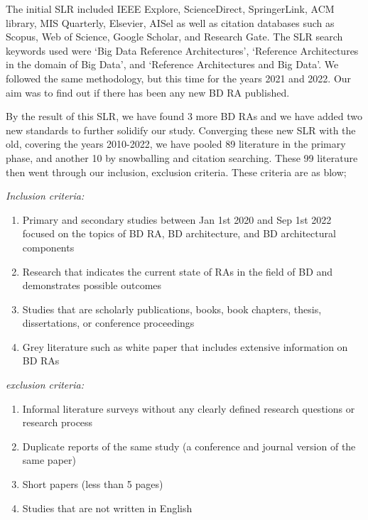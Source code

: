 \documentclass[review]{elsarticle}
\begin{document}
\begin{enumerate}
    The initial SLR included IEEE Explore, ScienceDirect, SpringerLink, ACM library, MIS Quarterly, Elsevier, AISel as well as citation databases such as Scopus, Web of Science, Google Scholar, and Research Gate. The SLR search keywords used were `Big Data Reference Architectures’, `Reference Architectures in the domain of Big Data’, and `Reference Architectures and Big Data’. We followed the same methodology, but this time for the years 2021 and 2022. Our aim was to find out if there has been any new BD RA published.

    By the result of this SLR, we have found 3 more BD RAs \cite{AtaeiApsec,castellanos2021smart,sang2017simplifying} and we have added two new standards \cite{ISO20546,ISO20547} to further solidify our study. Converging these new SLR with the old, covering the years 2010-2022, we have pooled 89 literature in the primary phase, and another 10 by snowballing and citation searching. These 99 literature then went through our inclusion, exclusion criteria. These criteria are as blow;

        \emph{Inclusion criteria:}
        \begin{enumerate}
            \item Primary and secondary studies between Jan 1st 2020 and Sep 1st 2022 focused on the topics of BD RA, BD architecture, and BD architectural components
            \item Research that indicates the current state of RAs in the field of BD and demonstrates possible outcomes
            \item Studies that are scholarly publications, books, book chapters, thesis, dissertations, or conference proceedings 
            \item Grey literature such as white paper that includes extensive information on BD RAs
        \end{enumerate}
        \emph{exclusion criteria:}
        \begin{enumerate}
            \item Informal literature surveys without any clearly defined research questions or research process
            \item Duplicate reports of the same study (a conference and journal version of the same paper)
            \item Short papers (less than 5 pages)
            \item Studies that are not written in English
        \end{enumerate}


\end{enumerate}
\end{document}
